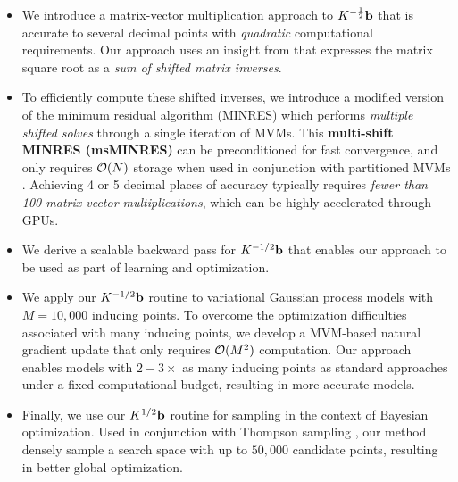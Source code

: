 \begin{itemize}
  \item We introduce a matrix-vector multiplication approach to $K^{-\frac 1 2} \mathbf{b}$ that is accurate to several decimal points with \emph{quadratic} computational requirements.
    Our approach uses an insight from \citet{hale2008computing} that expresses the matrix square root as a \emph{sum of shifted matrix inverses}.

  \item To efficiently compute these shifted inverses, we introduce a modified version of the minimum residual algorithm (MINRES) \cite{paige1975solution} which performs \emph{multiple shifted solves} through a single iteration of MVMs.
    This {\bf multi-shift MINRES (msMINRES)} can be preconditioned for fast convergence, and only requires $\bigo{N}$ storage when used in conjunction with partitioned MVMs \cite{wang2019exact,charlier2020kernel}.
    Achieving 4 or 5 decimal places of accuracy typically requires \emph{fewer than 100 matrix-vector multiplications}, which can be highly accelerated through GPUs.

  \item We derive a scalable backward pass for $K^{-1/2} \mathbf{b}$ that enables our approach to be used as part of learning and optimization.

  \item We apply our $K^{-1/2} \mathbf{b}$ routine to variational Gaussian process models with $M = 10,\!000$ inducing points.
    To overcome the optimization difficulties associated with many inducing points, we develop a MVM-based natural gradient update that only requires $\bigo{M^2}$ computation.
    Our approach enables models with $2-3\times$ as many inducing points as standard approaches under a fixed computational budget, resulting in more accurate models.

  \item Finally, we use our $K^{1/2} \mathbf{b}$ routine for sampling in the context of Bayesian optimization. %
    Used in conjunction with Thompson sampling \cite{thompson1933likelihood}, our method densely sample a search space with up to $50,\!000$ candidate points, resulting in better global optimization.
\end{itemize}
